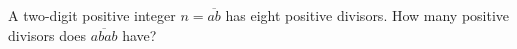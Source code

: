 A two-digit positive integer $ n=\overline{ab}$ has eight positive divisors. How many positive divisors does $\overline{abab}$ have?
